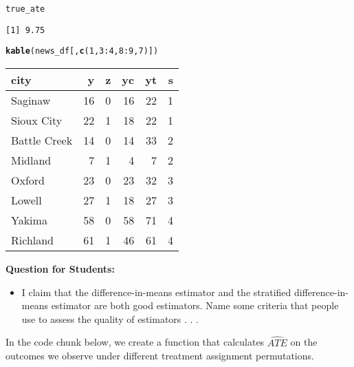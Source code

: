 \documentclass[11pt,leqno]{article}\usepackage[]{graphicx}\usepackage[]{color}
\makeatletter
\newcommand{\hlnum}[1]{\textcolor[rgb]{0.686,0.059,0.569}{#1}}%
\newcommand{\hlopt}[1]{\textcolor[rgb]{0,0,0}{#1}}%
\newcommand{\hlstd}[1]{\textcolor[rgb]{0.345,0.345,0.345}{#1}}%
\newcommand{\hlkwd}[1]{\textcolor[rgb]{0.737,0.353,0.396}{\textbf{#1}}}%
\newenvironment{kframe}{%
 \def\at@end@of@kframe{}%
 \ifinner\ifhmode%
  \def\at@end@of@kframe{\end{minipage}}%
  \begin{minipage}{\columnwidth}%
 \fi\fi%
 \def\FrameCommand##1{\hskip\@totalleftmargin \hskip-\fboxsep
 \colorbox{shadecolor}{##1}\hskip-\fboxsep
     \hskip-\linewidth \hskip-\@totalleftmargin \hskip\columnwidth}%
 \MakeFramed {\advance\hsize-\width
   \@totalleftmargin\z@ \linewidth\hsize
   \@setminipage}}%
 {\par\unskip\endMakeFramed%
 \at@end@of@kframe}
\newenvironment{knitrout}{}{} %
\theoremstyle{newstyle}
\makeatother
\begin{document}
\begin{knitrout}
\begin{kframe}
\begin{alltt}
\hlstd{true_ate}
\end{alltt}
\begin{verbatim}
[1] 9.75
\end{verbatim}
\begin{alltt}
\hlkwd{kable}\hlstd{(news_df[,} \hlkwd{c}\hlstd{(}\hlnum{1}\hlstd{,} \hlnum{3}\hlopt{:}\hlnum{4}\hlstd{,} \hlnum{8}\hlopt{:}\hlnum{9}\hlstd{,} \hlnum{7}\hlstd{)])}
\end{alltt}
\end{kframe}
\begin{tabular}{l|r|r|r|r|r}
\hline
city & y & z & yc & yt & s\\
\hline
Saginaw & 16 & 0 & 16 & 22 & 1\\
\hline
Sioux City & 22 & 1 & 18 & 22 & 1\\
\hline
Battle Creek & 14 & 0 & 14 & 33 & 2\\
\hline
Midland & 7 & 1 & 4 & 7 & 2\\
\hline
Oxford & 23 & 0 & 23 & 32 & 3\\
\hline
Lowell & 27 & 1 & 18 & 27 & 3\\
\hline
Yakima & 58 & 0 & 58 & 71 & 4\\
\hline
Richland & 61 & 1 & 46 & 61 & 4\\
\hline
\end{tabular}


\end{knitrout}

\vspace{5mm}
\begin{mdframed}
\textbf{Question for Students:}
\vspace{-5mm}
\begin{itemize}\itemsep1pt
\item I claim that the difference-in-means estimator and the stratified difference-in-means estimator are both good estimators. Name some criteria that people use to assess the quality of estimators . . .
\end{itemize}
\end{mdframed}

In the code chunk below, we create a function that calculates $\widehat{ATE}$ on the outcomes we observe under different treatment assignment permutations.
\end{document}
